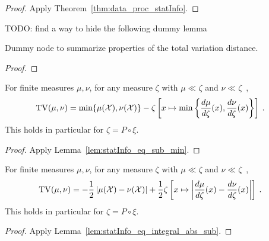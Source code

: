\begin{proof}\leanok
{}
Apply Theorem~\ref{thm:data_proc_statInfo}.
\end{proof}


TODO: find a way to hide the following dummy lemma
\begin{lemma}
  \label{lem:tv_properties}
  \leanok
  Dummy node to summarize properties of the total variation distance.
\end{lemma}

\begin{proof}\leanok
{}
\end{proof}


\begin{lemma}
  \label{lem:tv_eq_sub_min}
  For finite measures $\mu, \nu$, for any measure $\zeta$ with $\mu \ll \zeta$ and $\nu \ll \zeta$~,
  \begin{align*}
  \operatorname{TV}(\mu, \nu)
  &= \min\{\mu(\mathcal X), \nu(\mathcal X)\} - \zeta\left[x \mapsto \min \left\{\frac{d \mu}{d\zeta}(x), \frac{d \nu}{d\zeta}(x)\right\}\right]
  \: .
  \end{align*}
  This holds in particular for $\zeta = P \circ \xi$.
\end{lemma}

\begin{proof}%
{}
Apply Lemma~\ref{lem:statInfo_eq_sub_min}.
\end{proof}


\begin{lemma}
  \label{lem:tv_eq_integral_abs_sub}
  For finite measures $\mu, \nu$, for any measure $\zeta$ with $\mu \ll \zeta$ and $\nu \ll \zeta$~,
  \begin{align*}
  \operatorname{TV}(\mu, \nu)
  &= - \frac{1}{2} \left\vert \mu(\mathcal X) - \nu(\mathcal X) \right\vert + 
  \frac{1}{2} \zeta\left[x \mapsto \left\vert \frac{d \mu}{d\zeta}(x) - \frac{d \nu}{d\zeta}(x)\right\vert\right] 
  \: .
  \end{align*}
  This holds in particular for $\zeta = P \circ \xi$.
\end{lemma}

\begin{proof}%
{}
Apply Lemma~\ref{lem:statInfo_eq_integral_abs_sub}.
\end{proof}


